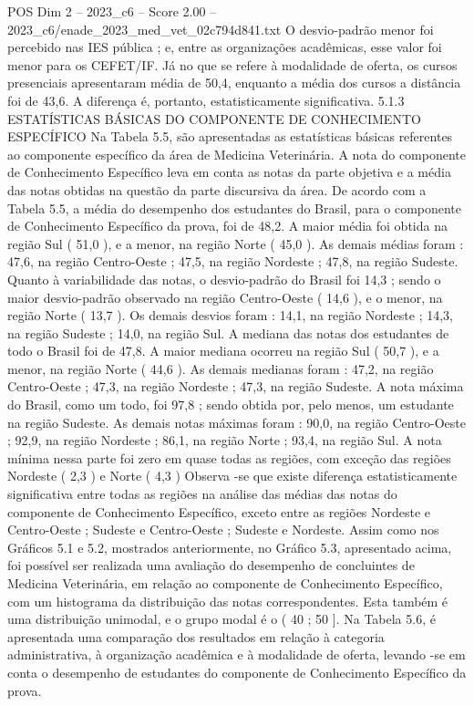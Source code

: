 \begin{textsample}{POS Dim 2 – 2023\_c6 – Score 2.00 – 2023\_c6/enade\_2023\_med\_vet\_02c794d841.txt}
O desvio-padrão menor foi percebido nas IES pública ; e, entre as organizações acadêmicas, esse valor foi menor para os CEFET/IF.
Já no que se refere à modalidade de oferta, os cursos presenciais apresentaram média de 50,4, enquanto a média dos cursos a distância foi de 43,6.
A diferença é, portanto, estatisticamente significativa. 5.1.3 ESTATÍSTICAS BÁSICAS DO COMPONENTE DE CONHECIMENTO ESPECÍFICO Na Tabela 5.5, são apresentadas as estatísticas básicas referentes ao componente específico da área de Medicina Veterinária.
A nota do componente de Conhecimento Específico leva em conta as notas da parte objetiva e a média das notas obtidas na questão da parte discursiva da área.
De acordo com a Tabela 5.5, a média do desempenho dos estudantes do Brasil, para o componente de Conhecimento Específico da prova, foi de 48,2.
A maior média foi obtida na região Sul ( 51,0 ), e a menor, na região Norte ( 45,0 ).
As demais médias foram : 47,6, na região Centro-Oeste ; 47,5, na região Nordeste ; 47,8, na região Sudeste.
Quanto à variabilidade das notas, o desvio-padrão do Brasil foi 14,3 ; sendo o maior desvio-padrão observado na região Centro-Oeste ( 14,6 ), e o menor, na região Norte ( 13,7 ).
Os demais desvios foram : 14,1, na região Nordeste ; 14,3, na região Sudeste ; 14,0, na região Sul.
A mediana das notas dos estudantes de todo o Brasil foi de 47,8.
A maior mediana ocorreu na região Sul ( 50,7 ), e a menor, na região Norte ( 44,6 ).
As demais medianas foram : 47,2, na região Centro-Oeste ; 47,3, na região Nordeste ; 47,3, na região Sudeste.
A nota máxima do Brasil, como um todo, foi 97,8 ; sendo obtida por, pelo menos, um estudante na região Sudeste.
As demais notas máximas foram : 90,0, na região Centro-Oeste ; 92,9, na região Nordeste ; 86,1, na região Norte ; 93,4, na região Sul.
A nota mínima nessa parte foi zero em quase todas as regiões, com exceção das regiões Nordeste ( 2,3 ) e Norte ( 4,3 ) Observa -se que existe diferença estatisticamente significativa entre todas as regiões na análise das médias das notas do componente de Conhecimento Específico, exceto entre as regiões Nordeste e Centro-Oeste ; Sudeste e Centro-Oeste ; Sudeste e Nordeste.
Assim como nos Gráficos 5.1 e 5.2, mostrados anteriormente, no Gráfico 5.3, apresentado acima, foi possível ser realizada uma avaliação do desempenho de concluintes de Medicina Veterinária, em relação ao componente de Conhecimento Específico, com um histograma da distribuição das notas correspondentes.
Esta também é uma distribuição unimodal, e o grupo modal é o ( 40 ; 50 ].
Na Tabela 5.6, é apresentada uma comparação dos resultados em relação à categoria administrativa, à organização acadêmica e à modalidade de oferta, levando -se em conta o desempenho de estudantes do componente de Conhecimento Específico da prova.

\end{textsample}
